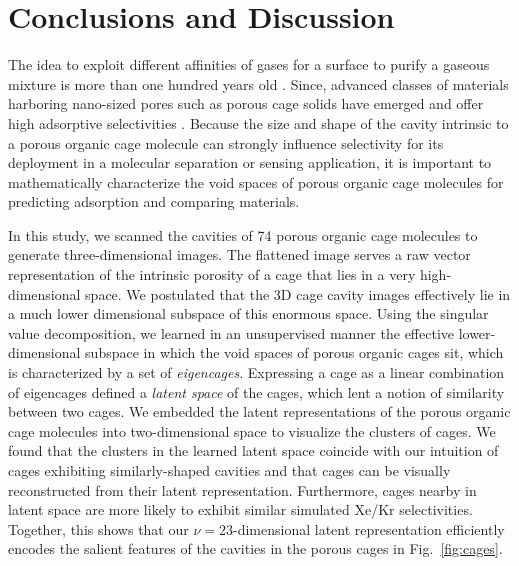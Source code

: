 \documentclass[journal=jacsat,manuscript=article,layout=traditional]{achemso}
\begin{document}
\section{Conclusions and Discussion}
The idea to exploit different affinities of gases for a surface to purify a gaseous mixture is more than one hundred years old \cite{boyle1908theabsorption}. Since, advanced classes of materials harboring nano-sized pores such as porous cage solids \cite{hasell2016porous,holst2010porous} have emerged and offer high adsorptive selectivities \cite{mastalerz2011salicylbisimine,tian2009amorphous,
hong2015porphyrin,chen2014separation,patil2016noria,sf6seps}.
Because the size and shape of the cavity intrinsic to a porous organic cage molecule can strongly influence selectivity for its deployment in a molecular separation or sensing application\cite{mitra2013molecular}, it is important to mathematically characterize the void spaces of porous organic cage molecules for predicting adsorption and comparing materials. 

In this study, we scanned the cavities of 74 porous organic cage molecules to generate three-dimensional images. The flattened image serves a raw vector representation of the intrinsic porosity of a cage that lies in a very high-dimensional space. We postulated that the 3D cage cavity images effectively lie in a much lower dimensional subspace of this enormous space. Using the singular value decomposition, we learned in an unsupervised manner the effective lower-dimensional subspace in which the void spaces of porous organic cages sit, which is characterized by a set of \emph{eigencages}. Expressing a cage as a linear combination of eigencages defined a \emph{latent space} of the cages, which lent a notion of similarity between two cages. We embedded the latent representations of the porous organic cage molecules into two-dimensional space to visualize the clusters of cages. We found that the clusters in the learned latent space coincide with our intuition of cages exhibiting similarly-shaped cavities and that cages can be visually reconstructed from their latent representation. Furthermore, cages nearby in latent space are more likely to exhibit similar simulated Xe/Kr selectivities. Together, this shows that our $\nu=23$-dimensional latent representation efficiently encodes the salient features of the cavities in the porous cages in Fig.~\ref{fig:cages}.
\end{document}
